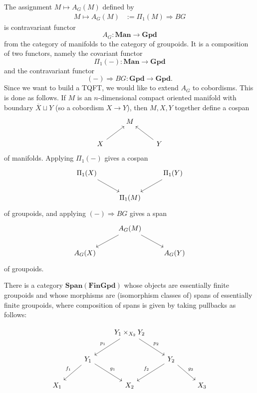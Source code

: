 \documentclass[12pt]{article}
\begin{document}
The assignment $M \mapsto A_G(M)$ defined by \begin{align*}
    M \mapsto A_G(M) & := \Pi_1(M) \Rightarrow BG
\end{align*}
is contravariant functor
\begin{equation} \label{eq:AG-functor}
    A_G : \mathbf{Man} \to \mathbf{Gpd}
\end{equation}
from the category of manifolds to the category of groupoids. It is a composition of two functors, namely the covariant functor
\[
    \Pi_1(-) : \mathbf{Man} \to \mathbf{Gpd}
\]
and the contravariant functor
\[
    (-) \Rightarrow BG : \mathbf{Gpd} \to \mathbf{Gpd}.
\]
Since we want to build a TQFT, we would like to extend $A_G$ to cobordisms. This is done as follows. If $M$ is an $n$-dimensional compact oriented manifold with boundary $\overline{X} \sqcup Y$ (so a cobordism $X \to Y$), then $M,X,Y$ together define a cospan
\begin{equation} \label{eq:cospan-manifolds}
    \begin{tikzcd}
        & M & \\
        X \arrow[ur] & & Y \arrow[ul]
    \end{tikzcd}
\end{equation}
of manifolds. Applying $\Pi_1(-)$ gives a cospan
\begin{equation} \label{eq:cospan-groupoids}
    \begin{tikzcd}
        \Pi_1(X) \arrow[dr] & & \Pi_1(Y) \arrow[dl] \\
        & \Pi_1(M) &
    \end{tikzcd}
\end{equation}
of groupoids, and applying $(-)\Rightarrow BG$ gives a span
\begin{equation} \label{eq:span-groupoids}
    \begin{tikzcd}
        & A_G(M) \arrow[dl] \arrow[dr] & \\
        A_G(X) & & A_G(Y)
    \end{tikzcd}
\end{equation}
of groupoids.

There is a category $\mathbf{Span}(\mathbf{FinGpd})$ whose objects are essentially finite groupoids and whose morphisms are (isomorphism classes of) spans of essentially finite groupoids, where composition of spans is given by taking pullbacks as follows:

\begin{equation}\label{eq:pullback-span}
    \begin{tikzcd}[row sep=2.2em, column sep=2.4em]
        & & Y_1 \times_{X_2} Y_2 \arrow[ld, "p_1"'] \arrow[rd, "p_2"] & & \\
        & Y_1 \arrow[ld, "f_1"'] \arrow[rd, "g_1"] & & Y_2 \arrow[ld, "f_2"'] \arrow[rd, "g_2"] & \\
        X_1 & & X_2 & & X_3
    \end{tikzcd}
\end{equation}
\end{document}
